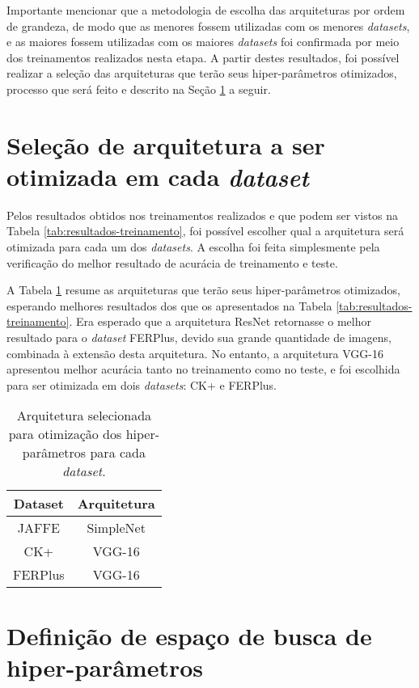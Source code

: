 \documentclass[
12pt,       %
openright,      %
oneside,      %
a4paper,      %
english,      %
french,       %
spanish,      %
brazil        %
]{abntex2}
\begin{document}
Importante mencionar que a metodologia de escolha das arquiteturas por ordem de grandeza, de modo que as menores fossem utilizadas com os menores \textit{datasets}, e as maiores fossem utilizadas com os maiores \textit{datasets} foi confirmada por meio dos treinamentos realizados nesta etapa. A partir destes resultados, foi possível realizar a seleção das arquiteturas que terão seus hiper-parâmetros otimizados, processo que será feito e descrito na Seção \ref{selecao-arquiteturas} a seguir.

\section{Seleção de arquitetura a ser otimizada em cada \textit{dataset}} \label{selecao-arquiteturas}

Pelos resultados obtidos nos treinamentos realizados e que podem ser vistos na Tabela \ref{tab:resultados-treinamento}, foi possível escolher qual a arquitetura será otimizada para cada um dos \textit{datasets}. A escolha foi feita simplesmente pela verificação do melhor resultado de acurácia de treinamento e teste.

A Tabela \ref{tab:selecao-arquiteturas} resume as arquiteturas que terão seus hiper-parâmetros otimizados, esperando melhores resultados dos que os apresentados na Tabela \ref{tab:resultados-treinamento}. Era esperado que a arquitetura ResNet retornasse o melhor resultado para o \textit{dataset} FERPlus, devido sua grande quantidade de imagens, combinada à extensão desta arquitetura. No entanto, a arquitetura VGG-16 apresentou melhor acurácia tanto no treinamento como no teste, e foi escolhida para ser otimizada em dois \textit{datasets}: CK+ e FERPlus.

\begin{table}[H]
\centering
\caption{Arquitetura selecionada para otimização dos hiper-parâmetros para cada \textit{dataset}.}
\label{tab:selecao-arquiteturas}
\begin{tabular}{@{}cc@{}}
\toprule
\textbf{Dataset} & \textbf{Arquitetura} \\ \midrule
JAFFE            & SimpleNet            \\
CK+              & VGG-16               \\
FERPlus          & VGG-16               \\ \bottomrule
\end{tabular}
\end{table}

\section{Definição de espaço de busca de hiper-parâmetros} \label{definicao-espaco-busca}
\end{document}
